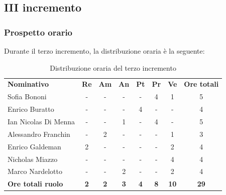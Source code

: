 \documentclass[../piano-di-progetto.tex]{subfiles}
\begin{document}
  \subsection{III incremento}

  \subsubsection{Prospetto orario}
 Durante il terzo incremento, la distribuzione oraria è la seguente:
  \begin{table}[H]
    \centering
    \begin{tabular}{lccccccc}
    \rowcolor{lightgray}
    \textbf{Nominativo}       & \textbf{Re} & \textbf{Am} & \textbf{An} & \textbf{Pt} & \textbf{Pr} & \textbf{Ve} & \textbf{Ore totali} \\
Sofia Bononi              & -           & -           & -           & -           & 4           & 1           & 5                   \\
Enrico Buratto            & -           & -           & -           & 4           & -           & -           & 4                   \\
Ian Nicolas Di Menna      & -           & -           & 1           & -           & 4           & -           & 5                   \\
Alessandro Franchin       & -           & 2           & -           & -           & -           & 1           & 3                   \\
Enrico Galdeman           & 2           & -           & -           & -           & -           & 2           & 4                   \\
Nicholas Miazzo           & -           & -           & -           & -           & -           & 4           & 4                   \\
Marco Nardelotto          & -           & -           & 2           & -           & -           & 2           & 4                   \\
\textbf{Ore totali ruolo} & \textbf{2}  & \textbf{2}  & \textbf{3}  & \textbf{4}  & \textbf{8}  & \textbf{10} & \textbf{29}        
    
    \end{tabular}
    \caption{Distribuzione oraria del terzo incremento}
  \end{table}
\end{document}
